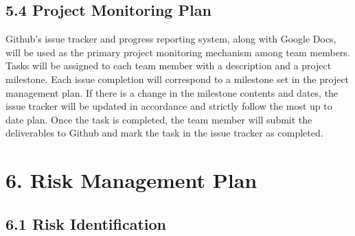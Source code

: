 \documentclass[]{article}
\begin{document}
\subsection{5.4 Project Monitoring Plan}\label{project-monitoring-plan}

Github's issue tracker and progress reporting system, along with Google
Docs, will be used as the primary project monitoring mechanism among
team members. Tasks will be assigned to each team member with a
description and a project milestone. Each issue completion will
correspond to a milestone set in the project management plan. If there
is a change in the milestone contents and dates, the issue tracker will
be updated in accordance and strictly follow the most up to date plan.
Once the task is completed, the team member will submit the deliverables
to Github and mark the task in the issue tracker as completed.

\section{6. Risk Management Plan}\label{risk-management-plan}

\subsection{6.1 Risk Identification}\label{risk-identification}
\end{document}
